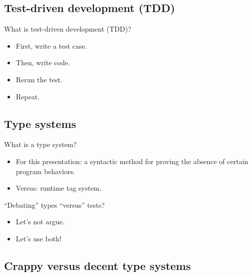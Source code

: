 \subsection{Test-driven development (TDD)}

\begin{frame}{What is test-driven development (TDD)?}
  \begin{itemize}
  \item First, write a test case.
  \item Then, write code.
  \item Rerun the test.
  \item Repeat.
  \end{itemize}
\end{frame}

\subsection{Type systems}

\begin{frame}{What is a type system?}
  \begin{itemize}
  \item For this presentation: a \alert{syntactic} method for \alert{proving} the absence of certain program behaviors.
  \item Versus: runtime tag system.
  \end{itemize}

  ``Debating'' types ``versus'' tests?
  \begin{itemize}
  \item Let's not argue.
  \item Let's use both!
  \end{itemize}
\end{frame}

\subsection{Crappy versus decent type systems}

